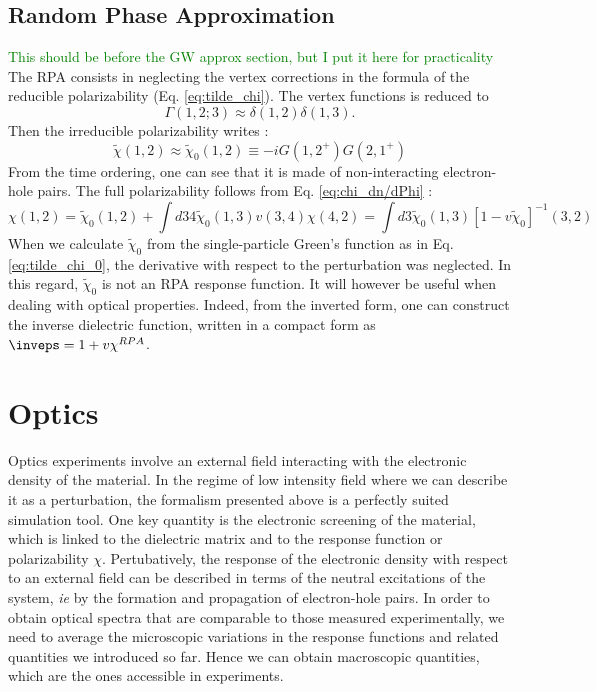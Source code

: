 \subsection{Random Phase Approximation} 
\textcolor{green}{This should be before the GW approx section, but I put it here for practicality}
The \gls{RPA} consists in neglecting the vertex corrections in the formula of the reducible polarizability (Eq. \eqref{eq:tilde_chi}). The vertex functions is reduced to 
\begin{equation}
	\Gamma(1,2;3) \approx \delta(1,2)\delta(1,3).
\end{equation}
Then the irreducible polarizability writes :
\begin{equation}
	\tilde{\chi}(1,2) \approx \tilde{\chi}_0(1,2) \equiv -i G(1,2^+)G(2,1^+) \label{eq:tilde_chi_0}
\end{equation}
From the time ordering, one can see that it is made of non-interacting electron-hole pairs. The full polarizability follows from Eq. \eqref{eq:chi_dn/dPhi} :
\begin{equation}
	\chi(1,2) = \tilde{\chi}_0(1,2) + \int d34 \tilde{\chi}_0(1,3) v(3,4) \chi(4,2) = \int d3 \tilde{\chi}_0(1,3) \left[ 1 - v \tilde{\chi}_0\right]^{-1}(3,2)
\end{equation}
When we calculate $\tilde{\chi}_0$ from the single-particle Green's function as in Eq. \eqref{eq:tilde_chi_0}, the derivative with respect to the perturbation was neglected. In this regard, $\tilde{\chi}_0$ is not an \gls{RPA} response function. It will however be useful when dealing with optical properties.
Indeed, from the inverted form, one can construct the inverse dielectric function, written in a compact form as $\inveps = 1+v \chi^{RPA}$.

\section{Optics}
Optics experiments involve an external field interacting with the electronic density of the material. In the regime of low intensity field where we can describe it as a perturbation, the formalism presented above is a perfectly suited simulation tool. One key quantity is the electronic screening of the material, which is linked to the dielectric matrix and to the response function or polarizability $\chi$. Pertubatively, the response of the electronic density with respect to an external field can be described in terms of the neutral excitations of the system, \textit{ie} by the formation and propagation of electron-hole pairs.
In order to obtain optical spectra that are comparable to those measured experimentally, we need to average the microscopic variations in the response functions and related quantities we introduced so far. Hence we can obtain macroscopic quantities, which are the ones accessible in experiments. 

